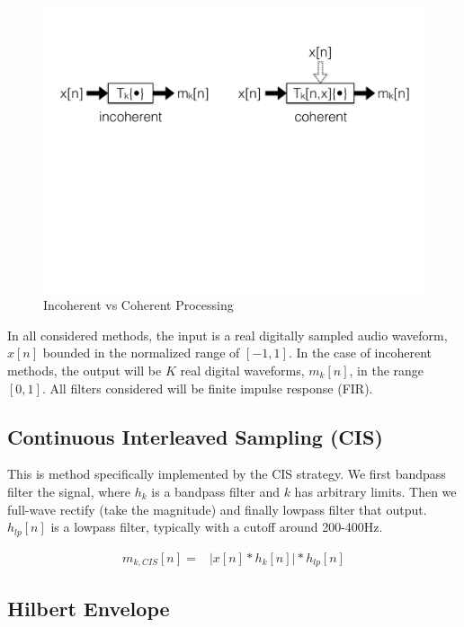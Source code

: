 \documentclass [11pt, proquest] {uwthesis}[2015/03/03]
\begin{document}
\begin{figure}[!ht]
  \centering
    \includegraphics[width=1\textwidth]{incoherent_vs_coherent}   
    \caption{Incoherent vs Coherent Processing}\label{fig:incoherent_vs_coherent}
\end{figure}

In all considered methods, the input is a real digitally sampled audio waveform, $x[n]$ bounded in the normalized range of $[-1, 1]$.  In the case of incoherent methods, the output will be $K$ real digital waveforms, $m_k[n]$, in the range $[0, 1]$.  All filters considered will be finite impulse response (FIR).

\subsection{Continuous Interleaved Sampling (CIS)}

This is method specifically implemented by the CIS strategy.  We first bandpass filter the signal, where $h_k$ is a bandpass filter and $k$ has arbitrary limits.  Then we full-wave rectify (take the magnitude) and finally lowpass filter that output.  $h_{lp}[n]$ is a lowpass filter, typically with a cutoff around 200-400Hz.

\begin{align}
m_{k,CIS}[n] =& \Big| x[n] * h_k[n] \Big| * h_{lp}[n]
\end{align}


\subsection{Hilbert Envelope}
\end{document}
